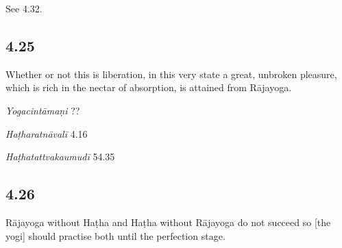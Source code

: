 \begin{ekdosis}


\begin{philcomm}[hp04_024_1]
See 4.32.
\end{philcomm}

\subsection*{4.25}
\begin{translation}[hp04_025]
Whether or not this is liberation, in this very state a great, unbroken pleasure, which is rich in the nectar of absorption, is attained from Rājayoga.
\end{translation}


\begin{testimonia}[hp04_025]
\emph{Yogacintāmaṇi} ??
\begin{versinnote}
\end{versinnote}

\emph{Haṭharatnāvalī} 4.16
\begin{versinnote}
\end{versinnote}

\emph{Haṭhatattvakaumudī} 54.35
\begin{versinnote}
\end{versinnote}
\end{testimonia}


\subsection*{4.26}
\begin{translation}[hp04_026]
Rājayoga without Haṭha and Haṭha without Rājayoga do not succeed so [the yogi] should practise both until the perfection stage.
\end{translation}


\end{ekdosis}
